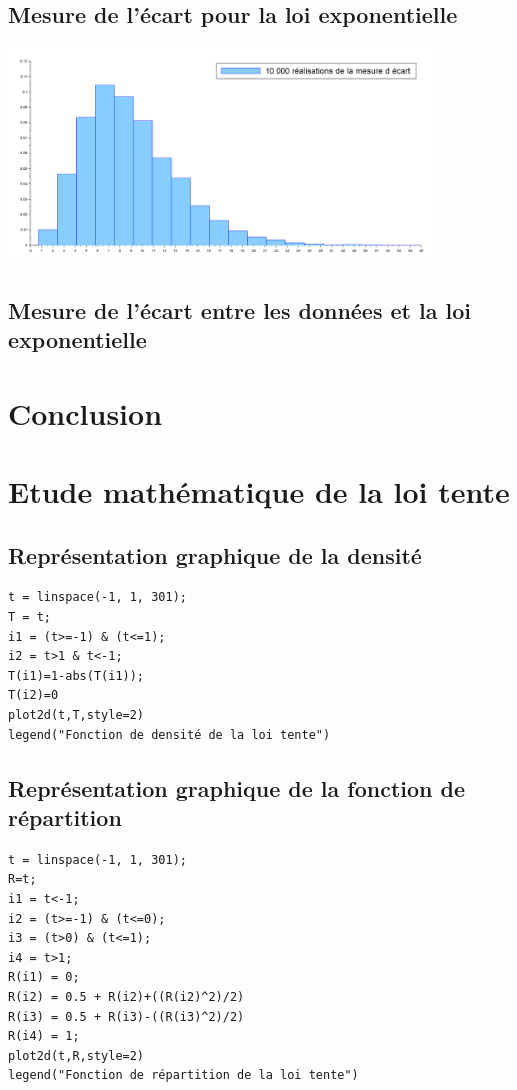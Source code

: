 \documentclass{article}
\begin{document}
\subsection{Mesure de l'écart pour la loi exponentielle}
\begin{center}
\includegraphics[width=425px]{img/ecart_expo.png}
\end{center}

\subsection{Mesure de l'écart entre les données et la loi exponentielle}



\section{Conclusion}
\paragraph{}

\newpage
\appendix

\section{Etude mathématique de la loi tente}
\subsection{Représentation graphique de la densité}
\begin{verbatim}
t = linspace(-1, 1, 301);
T = t;
i1 = (t>=-1) & (t<=1);
i2 = t>1 & t<-1;
T(i1)=1-abs(T(i1));
T(i2)=0
plot2d(t,T,style=2)
legend("Fonction de densité de la loi tente")
\end{verbatim}

\subsection{Représentation graphique de la fonction de répartition}
\begin{verbatim}
t = linspace(-1, 1, 301);
R=t;
i1 = t<-1;
i2 = (t>=-1) & (t<=0);
i3 = (t>0) & (t<=1);
i4 = t>1;
R(i1) = 0;
R(i2) = 0.5 + R(i2)+((R(i2)^2)/2)
R(i3) = 0.5 + R(i3)-((R(i3)^2)/2)
R(i4) = 1;
plot2d(t,R,style=2)
legend("Fonction de répartition de la loi tente")
\end{verbatim}
\end{document}
